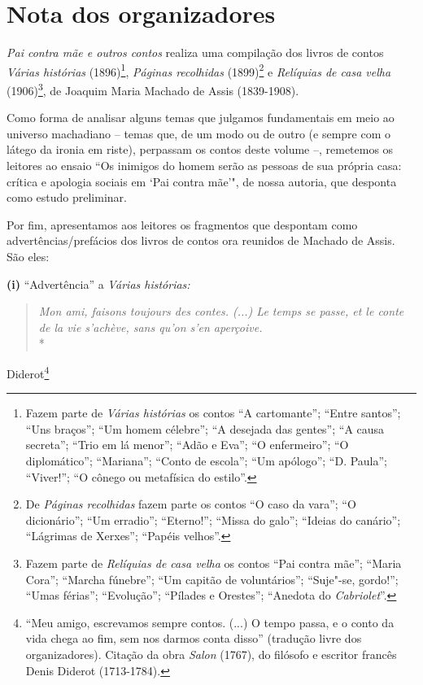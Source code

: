 
\chapter{Nota dos organizadores}

\emph{Pai contra mãe e outros contos} realiza uma compilação dos livros
de contos \emph{Várias histórias} (1896)\footnote{Fazem parte de
  \emph{Várias histórias} os contos ``A cartomante''; ``Entre santos'';
  ``Uns braços''; ``Um homem célebre''; ``A desejada das gentes''; ``A
  causa secreta''; ``Trio em lá menor''; ``Adão e Eva''; ``O
  enfermeiro''; ``O diplomático''; ``Mariana''; ``Conto de escola'';
  ``Um apólogo''; ``D. Paula''; ``Viver!''; ``O cônego ou metafísica do
  estilo''.}, \emph{Páginas recolhidas} (1899)\footnote{De \emph{Páginas
  recolhidas} fazem parte os contos ``O caso da vara''; ``O
  dicionário''; ``Um erradio''; ``Eterno!''; ``Missa do galo''; ``Ideias
  do canário''; ``Lágrimas de Xerxes''; ``Papéis velhos''.} e
\emph{Relíquias de casa velha} (1906)\footnote{Fazem parte de
  \emph{Relíquias de casa velha} os contos ``Pai contra mãe''; ``Maria
  Cora''; ``Marcha fúnebre''; ``Um capitão de voluntários''; ``Suje"-se,
  gordo!''; ``Umas férias''; ``Evolução''; ``Pílades e Orestes'';
  ``Anedota do \emph{Cabriolet}''.}, de Joaquim Maria Machado de Assis
(1839-1908).

Como forma de analisar alguns temas que julgamos fundamentais em meio ao
universo machadiano -- temas que, de um modo ou de outro (e sempre com o
látego da ironia em riste), perpassam os contos deste volume --,
remetemos os leitores ao ensaio ``Os inimigos do homem serão as pessoas
de sua própria casa: crítica e apologia sociais em `Pai contra mãe'",
de nossa autoria, que desponta como estudo preliminar.

Por fim, apresentamos aos leitores os fragmentos que despontam como
advertências/prefácios dos livros de contos ora reunidos de Machado de
Assis. São eles:

\textbf{(i)} ``Advertência'' a \emph{Várias histórias: }

\begin{quote}
\emph{Mon ami, faisons toujours des contes. (...) Le temps se passe, et
le conte de la vie s'achève, sans qu'on s'en aperçoive. }\\*\end{quote}
\begin{flushright}Diderot\footnote{``Meu amigo, escrevamos sempre contos. (...) O tempo%
  passa, e o conto da vida chega ao fim, sem nos darmos conta disso''
  (tradução livre dos organizadores). Citação da obra \emph{Salon}
  (1767), do filósofo e escritor francês Denis Diderot (1713-1784).}\end{flushright}

